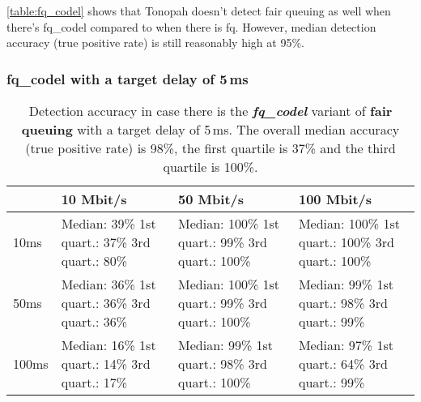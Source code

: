 \documentclass[conference]{IEEEtran}
\begin{document}
\autoref{table:fq_codel} shows that Tonopah doesn't detect fair queuing as well when there's fq\_codel compared to when there is fq. 
However, median detection accuracy (true positive rate) is still reasonably high at 95\%.

\subsubsection{fq\_codel with a target delay of 5\,ms}

\begin{table}
\begin{tabularx}{\columnwidth}{| l | X | X | X |}
\hline
& 10 Mbit/s & 50 Mbit/s & 100 Mbit/s \\ \hline
10ms & Median: 39\% \newline 1st quart.: 37\% \newline 3rd quart.: 80\% & Median: 100\% \newline 1st quart.: 99\% \newline 3rd quart.: 100\% & Median: 100\% \newline 1st quart.: 100\% \newline 3rd quart.: 100\%\\ \hline
50ms & Median: 36\% \newline 1st quart.: 36\% \newline 3rd quart.: 36\% & Median: 100\% \newline 1st quart.: 99\% \newline 3rd quart.: 100\% & Median: 99\% \newline 1st quart.: 98\% \newline 3rd quart.: 99\% \\ \hline
100ms & Median: 16\% \newline 1st quart.: 14\% \newline 3rd quart.: 17\% & Median: 99\% \newline 1st quart.: 98\% \newline 3rd quart.: 100\% & Median: 97\% \newline 1st quart.: 64\% \newline 3rd quart.: 99\% \\ \hline
\end{tabularx}
\caption{Detection accuracy in case there is the \textbf{\textit{fq\_codel}} variant of \textbf{fair queuing} with a target delay of 5\,ms. The overall median accuracy (true positive rate) is 98\%, the first quartile is 37\% and the third quartile is 100\%.}
\label{table:fq_codel_linux}
\end{table}            
\end{document}
